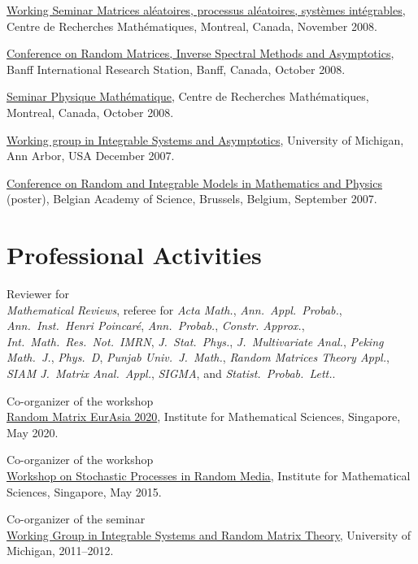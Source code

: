 \begin{item_list}
\item
  \href{http://www.crm.umontreal.ca/cal/en/mois200811.html}{Working Seminar Matrices al\'{e}atoires, processus al\'{e}atoires, syst\`{e}mes int\'{e}grables}, Centre de Recherches Math\'{e}matiques, Montreal, Canada, November 2008.
\item
  \href{http://www.birs.ca/events/2008/5-day-workshops/08w5017}{Conference on Random Matrices, Inverse Spectral Methods and Asymptotics}, Banff International Research Station, Banff, Canada, October 2008.
\item
  \href{http://www.crm.umontreal.ca/cal/en/mois200810.html}{Seminar Physique Math\'{e}matique}, Centre de Recherches Math\'{e}matiques, Montreal, Canada, October 2008.
\item
  \href{http://www.math.lsa.umich.edu/~millerpd/WGISA_archives/WGISA_Fall_07.html}{Working group in Integrable Systems and Asymptotics}, University of Michigan, Ann Arbor, USA December 2007.
\item
  \href{http://magelhaes.hzs.be/RIMMP/}{Conference on Random and Integrable Models in Mathematics and Physics} (poster), Belgian Academy of Science, Brussels, Belgium, September 2007.
\end{item_list}

\section*{Professional Activities }

\begin{item_list}
\item Reviewer for  \\
  \textit{Mathematical Reviews}, referee for \textit{Acta Math.}, \textit{Ann.\ Appl.\ Probab.}, \textit{Ann.\ Inst.\ Henri Poincar\'{e}}, \textit{Ann.\ Probab.}, \textit{Constr. Approx.}, \textit{Int.\ Math.\ Res.\ Not.\ IMRN}, \textit{J.\ Stat.\ Phys.}, \textit{J.\ Multivariate Anal.}, \textit{Peking Math.\ J.}, \textit{Phys.\ D}, \textit{Punjab Univ.\ J.\ Math.}, \textit{Random Matrices Theory Appl.}, \textit{SIAM J.\ Matrix Anal.\ Appl.}, \textit{SIGMA}, and \textit{Statist.\ Probab.\ Lett.}.
\item Co-organizer of the workshop  \\
  \href{https://ims.nus.edu.sg/events/2020/random/index.php}{Random Matrix EurAsia 2020}, Institute for Mathematical Sciences, Singapore, May 2020.
\item Co-organizer of the workshop  \\
  \href{http://www2.ims.nus.edu.sg/Programs/015wrandom/index.php}{Workshop on Stochastic Processes in Random Media}, Institute for Mathematical Sciences, Singapore, May 2015.
\item Co-organizer of the seminar  \\
  \href{http://www.math.lsa.umich.edu/seminars_events/events.php?eventdefid=43&dt_begin=2011-07-01&dt_end=2011-12-31}
  {Working Group in Integrable Systems and Random Matrix Theory}, University of Michigan, 2011--2012.
\end{item_list}

